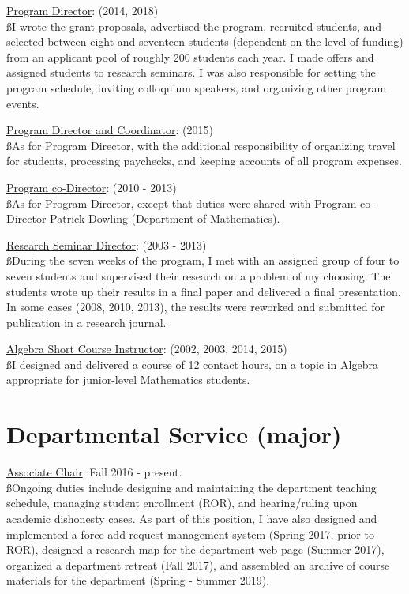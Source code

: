 \documentclass[overlapped,line,letterpaper]{res}
\begin{document}
\begin{resume}
\medskip

\underline{Program Director}: (2014, 2018) \\
{\ss I wrote the grant proposals, advertised the program, recruited students, and selected between eight and seventeen students (dependent on the level of funding) from an applicant pool of roughly 200 students each year.  I made offers and assigned students to research seminars.  I was also responsible for setting the program schedule, inviting colloquium speakers, and organizing other program events.}

\underline{Program Director and Coordinator}: (2015) \\
{\ss As for Program Director, with the additional responsibility of organizing travel for students, processing paychecks, and keeping accounts of all program expenses.}

\newpage
\underline{Program co-Director}: (2010 - 2013) \\
{\ss As for Program Director, except that duties were shared with Program co-Director Patrick Dowling (Department of Mathematics).}

\underline{Research Seminar Director}: (2003 - 2013) \\
{\ss During the seven weeks of the program, I met with an assigned group of four to seven students and supervised their 
research on a problem of my choosing.  The students wrote up their results in a final paper and delivered a final presentation.  In some cases (2008, 2010, 2013), the results were reworked and submitted for publication in a research journal.}

\underline{Algebra Short Course Instructor}: (2002, 2003, 2014, 2015) \\
{\ss I designed and delivered a course of 12 contact hours, on a topic in Algebra appropriate for junior-level Mathematics students.} 


\large
\section{\bf Departmental Service (major)}
\vspace{3 mm}
\normalsize
\underline{Associate Chair}: Fall 2016 - present. \\ 
{\ss Ongoing duties include designing and maintaining the department teaching schedule, managing student enrollment (ROR), and hearing/ruling upon academic dishonesty cases.  As part of this position, I have also designed and implemented a force add request management system (Spring 2017, prior to ROR), designed a research map for the department web page (Summer 2017), organized a department retreat (Fall 2017), and assembled an archive of course materials for the department (Spring - Summer 2019).}


\end{resume}
\end{document}
